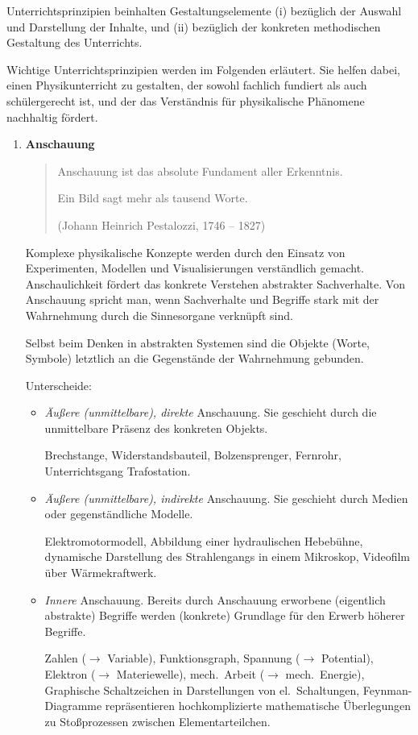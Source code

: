 \bip
Unterrichtsprinzipien beinhalten Gestaltungselemente (i) bez\"{u}glich der Auswahl und Darstellung der Inhalte, und (ii) bez\"{u}glich der konkreten methodischen Gestaltung des Unterrichts.

\bip
Wichtige Unterrichtsprinzipien werden im Folgenden erl\"{a}utert. Sie helfen dabei, einen Physikunterricht zu gestalten, der sowohl fachlich fundiert als auch sch\"{u}lergerecht ist, und der das Verst\"{a}ndnis f\"{u}r physikalische Ph\"{a}nomene nachhaltig f\"{o}rdert.

\begin{enumerate}
	\item \textbf{Anschauung}
	\begin{quote}
		Anschauung ist das absolute Fundament aller Erkenntnis.

		\mip
		Ein Bild sagt mehr als tausend Worte.

		\mip
		(Johann Heinrich Pestalozzi, 1746 -- 1827)
	\end{quote}

	Komplexe physikalische Konzepte werden durch den Einsatz von Experimenten, Modellen und Visualisierungen verst\"{a}ndlich gemacht. Anschaulichkeit f\"{o}rdert das konkrete Verstehen abstrakter Sachverhalte. Von Anschauung spricht man, wenn Sachverhalte und Begriffe stark mit der Wahrnehmung durch die Sinnesorgane verkn\"{u}pft sind.

	Selbst beim Denken in abstrakten Systemen sind die Objekte (Worte, Symbole) letztlich an die Gegenst\"{a}nde der Wahrnehmung gebunden.

	Unterscheide:
	\begin{itemize}
		\item {\it \"{A}u{\ss}ere (unmittelbare), direkte } Anschauung.
		Sie geschieht durch die unmittelbare Pr\"{a}senz des konkreten Objekts.
		\begin{beisp}
			Brechstange, Widerstandsbauteil, Bolzensprenger, Fernrohr, Unterrichtsgang Trafostation.
		\end{beisp}
		
		\item {\it \"{A}u{\ss}ere (unmittelbare), indirekte } Anschauung.
		Sie geschieht durch Medien oder gegenst\"{a}ndliche Modelle.
		\begin{beisp}
			Elektromotormodell, Abbildung einer hydraulischen Hebeb\"{u}hne,
		dynamische Darstellung des Strahlengangs in einem Mikroskop,
		Videofilm \"{u}ber W\"{a}rmekraftwerk.
		\end{beisp}
		\item {\it Innere}  Anschauung.
		Bereits durch Anschauung erworbene (eigentlich abstrakte) Begriffe werden (konkrete) Grundlage f\"{u}r den Erwerb h\"{o}herer Begriffe.
		\begin{beisp}
			Zahlen ($\to$ Variable), Funktionsgraph, Spannung ($\to$ Potential), Elektron ($\to$ Materiewelle), mech.\ Arbeit ($\to$ mech.\ Energie), Graphische Schaltzeichen in Darstellungen von el.\ Schaltungen, Feynman-Diagramme repr\"{a}sentieren hochkomplizierte mathematische \"{U}berlegungen zu Sto{\ss}prozessen zwischen Elementar\-teilchen.
		\end{beisp}


\end{itemize}
\end{enumerate}
